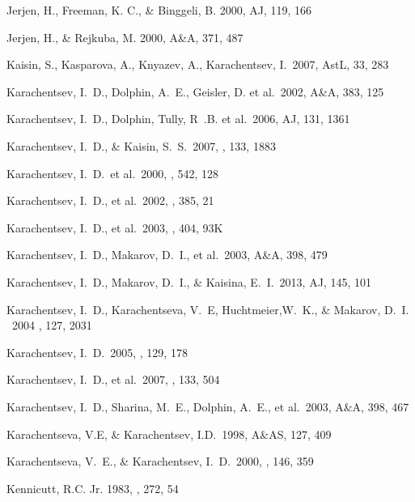 \documentclass[12pt,onecolumn]{emulateapj}
\begin{document}
\begin{thebibliography}{}
Jerjen, H., Freeman, K. C., \& Binggeli, B. 2000, AJ, 119, 166 
 
Jerjen, H., \& Rejkuba, M. 2000, A\&A, 371, 487 

Kaisin, S., Kasparova, A., Knyazev, A., Karachentsev, I.\ 2007, AstL, 33, 283 

Karachentsev, I.~D., Dolphin, A.~E., Geisler, D. et al.\ 2002, A\&A, 383, 125

Karachentsev, I.~D., Dolphin, Tully, R~.B. et al.\ 2006, AJ, 131, 1361

Karachentsev, I.~D., \& Kaisin, S.~S.\ 2007, \aj, 133, 1883 

Karachentsev, I.~D.~et al.\ 2000, \apj, 542, 128 

Karachentsev, I.~D., et al.\ 2002, \aap, 385, 21

Karachentsev, I.~D., et al.\ 2003, \aap, 404, 93K 

Karachentsev, I.~D., Makarov, D.~I., et al.\ 2003, A\&A, 398, 479

Karachentsev, I.~D., Makarov, D.~I., \& Kaisina, E.~I.\ 2013, AJ, 145, 101

Karachentsev, I.~D., Karachentseva, V.~E, Huchtmeier,W.~K., \& Makarov, D.~I. \ 2004 \aj, 127, 2031

Karachentsev, I.~D.\ 2005, \aj, 129, 178 

Karachentsev, I.~D., et al.\ 2007, \aj, 133, 504 

Karachentsev, I.~D., Sharina, M.~E., Dolphin, A.~E., et al.\ 2003, A\&A, 398, 467

Karachentseva, V.E, \& Karachentsev, I.D.\ 1998, A\&AS, 127, 409 

Karachentseva, V.~E., \& Karachentsev, I.~D.\ 2000, \aaps, 146, 359 

Kennicutt, R.C. Jr. 1983, \apj , 272, 54


\end{thebibliography}
\end{document}
